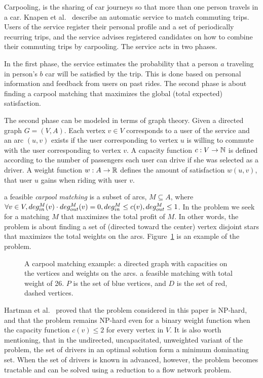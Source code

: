 Carpooling, is the sharing of car journeys so that more than one person travels
in a car.
Knapen et al.~\cite{knapen2013estimating} describe an automatic service
to match commuting trips.
Users of the service register their personal profile and a set of periodically
recurring trips, 
and the service advises registered candidates on how to combine their commuting
trips by carpooling.
The service acts in two phases. 

In the first phase, the service estimates the probability that a person $a$
traveling in person's $b$ car will be satisfied by the trip.
This is done based on personal information and feedback from users on past
rides.
The second phase is about finding a carpool matching
that maximizes the global (total expected) satisfaction.

The second phase can be modeled in terms of graph theory.
Given a directed graph $G = (V, A)$.
Each vertex $v \in V$ corresponds to a user of the service and an arc
$(u, v)$ exists if the user corresponding to vertex $u$ is willing to
commute with the user corresponding to vertex $v$.
A capacity function $ c: V \rightarrow \N $ is defined
according to the number of passengers each user can drive if she was
selected as a driver.
A weight function $w : A \rightarrow \R $ defines the amount of
satisfaction $w(u, v)$,
that user $u$ gains when riding with user $v$.

a feasible \emph{carpool matching} is a subset of arcs, 
$M \subseteq A$, where
$\forall v \in V, 
\din[M](v) \cdot \dout[M](v) = 0, 
\din[M] \leq c(v),
\dout[M] \leq 1$. 
In the \textsc{\CARPOOL{}} problem we seek for a matching $M$
that maximizes the total profit of $M$.
In other words, the \textsc{\CARPOOL{}} problem is about finding a set of 
(directed toward the center) vertex disjoint stars 
that maximizes the total weights on the arcs.
Figure~\ref{fig:carpool} is an example of the \textsc{\CARPOOL{}} problem.

\begin{figure}
\centering

\caption[]{
\label{fig:carpool}
A carpool matching example: 
a directed graph with capacities on the vertices and weights on the arcs. 
a feasible matching with total weight of 26.
$P$ is the set of blue vertices, and $D$ is the set of red, dashed vertices. 
}
\end{figure}  

Hartman et al.~\cite{hartman2013optimal} proved that the
\emph{\CARPOOL{}} problem considered in this paper is NP-hard,
and that the problem remains NP-hard even for a binary weight function when
the capacity function $c(v) \leq 2$ for every vertex in $V$.
It is also worth mentioning, that in the undirected, uncapacitated, unweighted
variant of the problem, the set of drivers in an optimal solution
form a minimum dominating set.
When the set of drivers is known in advanced, however, the problem becomes
tractable and can be solved using a reduction to a flow network problem.

